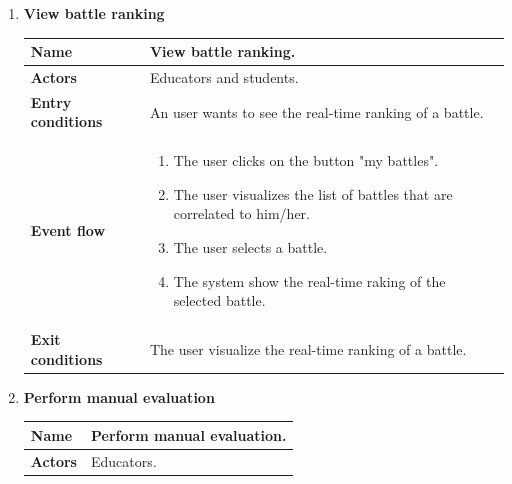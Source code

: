 \begin{enumerate}[label=\textbf{UC.\arabic*}]
\begin{table}[H]
\begin{tabular}{|m{3.2cm}|m{9.8cm}|}
                    \hline 
                \end{tabular}
        \end{table}
        \item {} \textbf{View battle ranking}
        \begin{table}[H]
    	    \centering
                \renewcommand{\arraystretch}{1.5}
                \begin{tabular}{|m{3.2cm}|m{9.8cm}|}
                    \hline
                    \textbf{Name} & View battle ranking. \\
                    \hline
                    \textbf{Actors} & Educators and students. \\
                    \hline
                    \textbf{Entry conditions}  & An user wants to see the real-time ranking of a battle. \\
                    \hline
                    \textbf{Event flow}  & 
                    \begin{enumerate}[label=\arabic*.]
                        \item The user clicks on the button "my battles".
                        \item The user visualizes the list of battles that are correlated to him/her.
                        \item The user selects a battle.
                        \item The system show the real-time raking of the selected battle.
                    \end{enumerate}\\ 
                    \hline
                    \textbf{Exit conditions}  & The user visualize the real-time ranking of a battle. \\
                    \hline
                \end{tabular}
        \end{table}
        \item {} \textbf{Perform manual evaluation}
        \begin{table}[H]
    	    \centering
                \renewcommand{\arraystretch}{1.5}
                \begin{tabular}{|m{3.2cm}|m{9.8cm}|}
                    \hline
                    \textbf{Name} & Perform manual evaluation. \\
                    \hline
                    \textbf{Actors} & Educators. \\

\end{tabular}
\end{table}
\end{enumerate}
